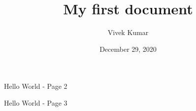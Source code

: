 \documentclass{article}
\title{My first document}
\date{December 29, 2020}
\author{Vivek Kumar}
\begin{document}
	
	
	\maketitle
	
	\newpage


	Hello World - Page 2

	\newpage

	Hello World - Page 3

	
\end{document}

